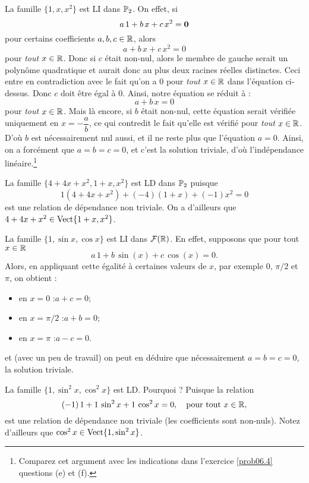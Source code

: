 \begin{myexample}\label{imp} La famille $\{ 1,x,x^2\}$ est LI dans $\mathbb{P}_2$. On effet, si
$$
a\,1 + b\,x + c\,x^2 = \mathbf{0}
$$
pour certains coefficients $a,b,c\in\mathbb{R}$, alors
$$
a + b\,x + c\, x^2 = 0 
$$ pour {\it tout $x\in\mathbb{R}$}. Donc si $c$ était non-nul, alors le membre de gauche serait un polynôme quadratique et aurait donc au plus deux racines réelles distinctes. Ceci entre en contradiction avec le fait qu'on a $0$ pour \emph{tout} $x\in\mathbb{R}$ dans l'équation ci-dessus. Donc $c$ doit être égal à $0$. Ainsi, notre équation se réduit à : 
$$
a + b\,x = 0 
$$ pour {\it tout $x\in\mathbb{R}$.} Mais l\`a encore, si $b$ était non-nul, cette équation serait vérifiée uniquement en $x=-\dfrac{a}{b}$, ce qui contredit le fait qu'elle est vérifié pour \emph{tout} $x\in\mathbb{R}$. D'o\`u $b$ est nécessairement nul aussi, et il ne reste plus que l'équation $a=0$. Ainsi, on a forcément que $a=b=c=0$, et c'est  la solution triviale, d'où l'indépendance linéaire.\footnote{Comparez cet argument avec les indications dans l'exercice \ref{prob06.4} questions (e) et (f).} \end{myexample}

\begin{myexample} La famille $\{ 4+4x+x^2, 1+x, x^2\}$ est LD dans $\mathbb{P}_2$ puisque
$$
1(4+4x+x^2) + (-4)(1+x) + (-1)x^2 = 0
$$
est une relation de dépendance non triviale.  On a d'ailleurs que $4+4x+x^2 \in \textrm{Vect}\{ 1+x, x^2\}$.
\end{myexample}

\begin{myexample} La famille $\{ 1, \sin x, \cos x\}$ est LI dans $\mathcal{F}(\mathbb{R})$. En effet, supposons que pour tout $x\in\mathbb{R}$
$$
a\, 1 + b\,\sin(x) + c\,\cos(x) = 0.
$$
Alors, en appliquant cette égalité à certaines valeurs de $x$, par exemple $0,\, \pi/2$ et $\pi$, on obtient :
\begin{itemize}
\item en $x=0$ :\quad $a+c = 0$;
\item en $x=\pi/2$ :\quad $a+b = 0$;
\item en $x=\pi$ :\quad $a-c = 0$.
\end{itemize}
et (avec un peu de travail) on peut en déduire que nécessairement $a=b=c=0$, la solution triviale. \end{myexample}


\begin{myexample} La famille $\{1, \sin^2 x, \cos^2 x\}$ est LD.  Pourquoi ?  Puisque la relation
$$
(-1)\, 1 + 1\, \sin^2 x + 1\, \cos^2 x = 0, \quad \textrm{pour tout $x\in \mathbb{R}$},
$$
est une relation de dépendance non triviale (les coefficients sont non-nuls).  Notez d'ailleurs que $\cos^2 x \in \textrm{Vect}\{1,\sin^2 x\}$.
\end{myexample}

